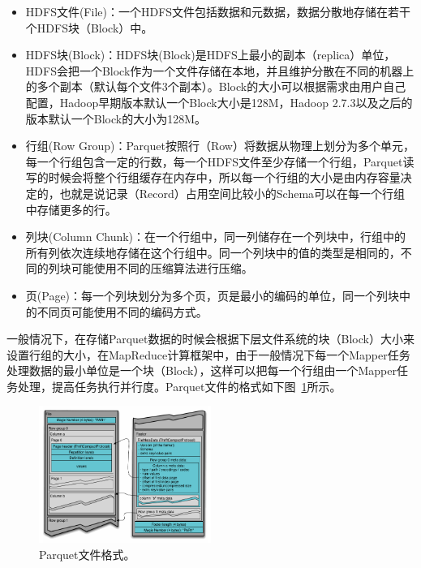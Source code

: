 \begin{itemize}
    \item HDFS文件(File)：一个HDFS文件包括数据和元数据，数据分散地存储在若干个HDFS块（Block）中。

    \item HDFS块(Block)：HDFS块(Block)是HDFS上最小的副本（replica）单位，HDFS会把一个Block作为一个文件存储在本地，并且维护分散在不同的机器上的多个副本（默认每个文件3个副本）。Block的大小可以根据需求由用户自己配置，Hadoop早期版本默认一个Block大小是128M，Hadoop 2.7.3以及之后的版本默认一个Block的大小为128M。
    
    \item 行组(Row Group)：Parquet按照行（Row）将数据从物理上划分为多个单元，每一个行组包含一定的行数，每一个HDFS文件至少存储一个行组，Parquet读写的时候会将整个行组缓存在内存中，所以每一个行组的大小是由内存容量决定的，也就是说记录（Record）占用空间比较小的Schema可以在每一个行组中存储更多的行。

    \item 列块(Column Chunk)：在一个行组中，同一列储存在一个列块中，行组中的所有列依次连续地存储在这个行组中。同一个列块中的值的类型是相同的，不同的列块可能使用不同的压缩算法进行压缩。

    \item 页(Page)：每一个列块划分为多个页，页是最小的编码的单位，同一个列块中的不同页可能使用不同的编码方式。
\end{itemize}

\par 一般情况下，在存储Parquet数据的时候会根据下层文件系统的块（Block）大小来设置行组的大小，在MapReduce计算框架中，由于一般情况下每一个Mapper任务处理数据的最小单位是一个块（Block），这样可以把每一个行组由一个Mapper任务处理，提高任务执行并行度。Parquet文件的格式如下图~\ref{fig:parquet-file-layout}所示。


\begin{figure}[]
	\centering
	\includegraphics[width=0.5\textwidth]{img/column-aware/FileLayout}
	
	\caption{Parquet文件格式。}
	\label{fig:parquet-file-layout}
\end{figure}

